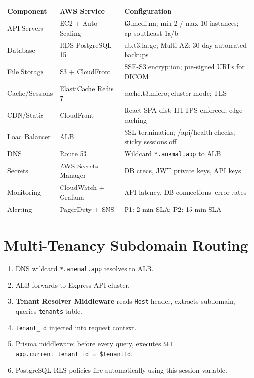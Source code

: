 \documentclass[12pt,a4paper]{report}
\begin{document}
\begin{longtable}{L{3.5cm} L{4.5cm} L{6cm}}
\toprule
\textbf{Component} & \textbf{AWS Service} & \textbf{Configuration} \\\midrule\endhead\bottomrule\endfoot
API Servers      & EC2 + Auto Scaling   & t3.medium; min 2 / max 10 instances; ap-southeast-1a/b \\
Database         & RDS PostgreSQL 15    & db.t3.large; Multi-AZ; 30-day automated backups \\
File Storage     & S3 + CloudFront      & SSE-S3 encryption; pre-signed URLs for DICOM \\
Cache/Sessions   & ElastiCache Redis 7  & cache.t3.micro; cluster mode; TLS \\
CDN/Static       & CloudFront           & React SPA dist; HTTPS enforced; edge caching \\
Load Balancer    & ALB                  & SSL termination; /api/health checks; sticky sessions off \\
DNS              & Route 53             & Wildcard \texttt{*.anemal.app} to ALB \\
Secrets          & AWS Secrets Manager  & DB creds, JWT private keys, API keys \\
Monitoring       & CloudWatch + Grafana & API latency, DB connections, error rates \\
Alerting         & PagerDuty + SNS      & P1: 2-min SLA; P2: 15-min SLA \\
\end{longtable}

\section{Multi-Tenancy Subdomain Routing}

\begin{enumerate}
  \item DNS wildcard \texttt{*.anemal.app} resolves to ALB.
  \item ALB forwards to Express API cluster.
  \item \textbf{Tenant Resolver Middleware} reads \texttt{Host} header, extracts subdomain, queries \texttt{tenants} table.
  \item \texttt{tenant\_id} injected into request context.
  \item Prisma middleware: before every query, executes \texttt{SET app.current\_tenant\_id = \$tenantId}.
  \item PostgreSQL RLS policies fire automatically using this session variable.
\end{enumerate}
\end{document}
